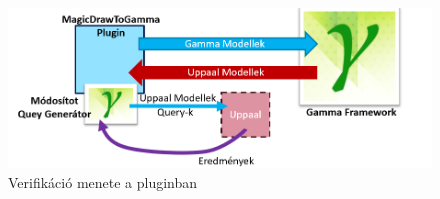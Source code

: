 \begin{figure}[!ht]
	\centering
	\includegraphics[width=150mm, keepaspectratio]{figures/preliminaries/concept.png}
	\caption{Verifikáció menete a pluginban}
	\label{fig:preliminaries-verif}
\end{figure}
